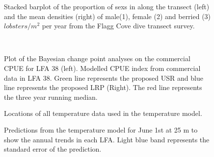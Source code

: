 \documentclass[11pt]{article}
\newcommand{\e}{\string~/bio.data/bio.lobster/figures/LFA3438Framework2019/figures/} %
\begin{document}
\begin{landscape}
\begin{figure}
    \centering

       \caption{Stacked barplot of the proportion of sexs in along the transect (left) and the mean densities (right) of male(1), female (2) and berried (3) $lobsters/m^2$ per year from the Flagg Cove dive transect survey.}

    \end{figure}


\begin{figure}
        \centering
                \\

\caption{Plot of the Bayesian change point analyses on the commercial CPUE for LFA 38 (left). Modelled CPUE index from commercial data in LFA 38. Green line represents the proposed USR and blue line represents the proposed LRP (Right). The red line represents the three year running median.  }
        \end{figure}
\end{landscape}




    \begin{figure}
    \centering
        \caption{Locations of all temperature data used in the temperature model.}

    \end{figure}


    \begin{figure}
    \centering
        \caption{Predictions from the temperature model for June 1st at 25 m to show the annual trends in each LFA. Light blue band represents the standard error of the prediction.}

    \end{figure}
  
\end{document}
